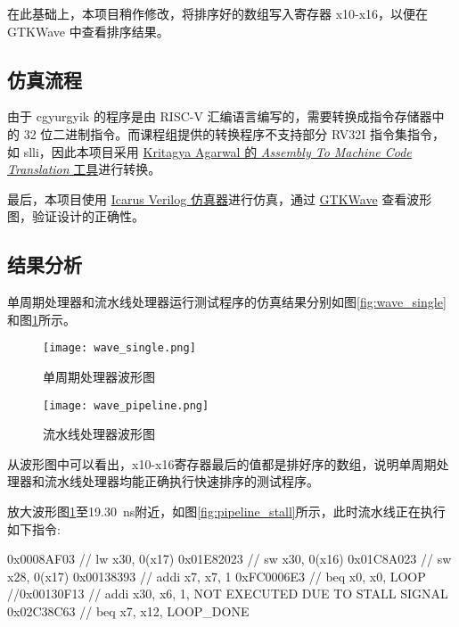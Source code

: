 \documentclass[lang=zh]{sjtuarticle}	%
\begin{document}
在此基础上，本项目稍作修改，将排序好的数组写入寄存器 x10-x16，以便在 GTKWave 中查看排序结果。

\subsection{仿真流程}

由于 cgyurgyik 的程序是由 RISC-V 汇编语言编写的，需要转换成指令存储器中的 32 位二进制指令。而课程组提供的转换程序不支持部分 RV32I 指令集指令，如 slli，因此本项目采用 \href{https://github.com/Kritagya-Agarwal/Assembly-To-Machine-Code-RISC-V}{Kritagya Agarwal 的 \textit{Assembly To Machine Code Translation} 工具}进行转换。

最后，本项目使用 \href{https://github.com/steveicarus/iverilog}{Icarus Verilog 仿真器}进行仿真，通过 \href{https://github.com/gtkwave/gtkwave}{GTKWave} 查看波形图，验证设计的正确性。

\subsection{结果分析}

单周期处理器和流水线处理器运行测试程序的仿真结果分别如图\ref{fig:wave_single}和图\ref{fig:wave_pipeline}所示。

\begin{figure}[!htp]
	\centering
	\begin{minipage}{\textwidth}
		\centering
		\texttt{[image: wave\_single.png]}
		\caption{单周期处理器波形图}
		\label{fig:wave_single}
	\end{minipage}
	\begin{minipage}{\textwidth}
		\centering
		\texttt{[image: wave\_pipeline.png]}
		\caption{流水线处理器波形图}
		\label{fig:wave_pipeline}
	\end{minipage}
\end{figure}

从波形图中可以看出，x10-x16寄存器最后的值都是排好序的数组，说明单周期处理器和流水线处理器均能正确执行快速排序的测试程序。

放大波形图\ref{fig:wave_pipeline}至\SI{19.30}{\ns}附近，如图\ref{fig:pipeline_stall}所示，此时流水线正在执行如下指令:

\begin{codeblock}
0x0008AF03	// lw x30, 0(x17)
0x01E82023	// sw x30, 0(x16)
0x01C8A023	// sw x28, 0(x17)
0x00138393	// addi x7, x7, 1
0xFC0006E3	// beq x0, x0, LOOP
//0x00130F13	// addi x30, x6, 1, NOT EXECUTED DUE TO STALL SIGNAL
0x02C38C63	// beq x7, x12, LOOP_DONE
\end{codeblock}
\end{document}
